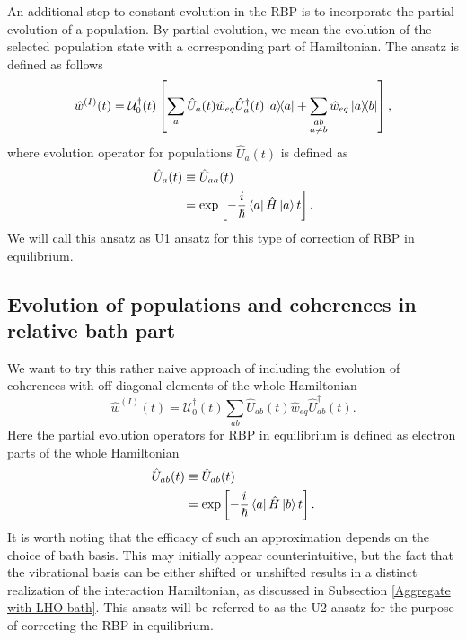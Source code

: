 An additional step to constant evolution in the RBP is to incorporate the partial evolution of a population. By partial evolution, we mean the evolution of the selected population state with a corresponding part of Hamiltonian. The ansatz is defined as follows
\begin{equation}
\label{U1_ansatz}
    \hat{w}^{(I)}(t) = \mathcal{U}^\dagger_0(t)\left[ \sum_{a} \hat{U}_{a}(t) \hat{w}_{eq} \hat{U}^\dagger_{a}(t) \ketbra{a}{a} + \sum_{\substack{ab \\ a\neq b}} \hat{w}_{eq} \ketbra{a}{b} \right],
\end{equation}
where evolution operator for populations $\hat{U}_{a}(t)$ is defined as
\begin{equation}
    \begin{aligned}
    \hat{U}_{a}(t) &\equiv \hat{U}_{aa}(t) \\
    &= \exp\left[ -\frac{i}{\hbar} \bra{a}\hat{H} \ket{a} t\right]. \\
    \end{aligned}
\end{equation}
We will call this ansatz as U1 ansatz for this type of correction of RBP in equilibrium.

\subsection{Evolution of populations and coherences in relative bath part}

We want to try this rather naive approach of including the evolution of coherences with off-diagonal elements of the whole Hamiltonian
\begin{equation}
    \hat{w}^{(I)}(t) = \mathcal{U}^\dagger_0(t) \sum_{ab} \hat{U}_{ab}(t) \hat{w}_{eq} \hat{U}^\dagger_{ab}(t).
\end{equation}
Here the partial evolution operators for RBP in equilibrium is defined as electron parts of the whole Hamiltonian
\begin{equation}
\label{U2_ansatz}
    \begin{aligned}
    \hat{U}_{ab}(t) &\equiv \hat{U}_{ab}(t) \\
    &= \exp\left[ -\frac{i}{\hbar} \bra{a}\hat{H} \ket{b} t\right]. \\
    \end{aligned}
\end{equation}
It is worth noting that the efficacy of such an approximation depends on the choice of bath basis. This may initially appear counterintuitive, but the fact that the vibrational basis can be either shifted or unshifted results in a distinct realization of the interaction Hamiltonian, as discussed in Subsection \ref{Aggregate with LHO bath}. This ansatz will be referred to as the U2 ansatz for the purpose of correcting the RBP in equilibrium.

